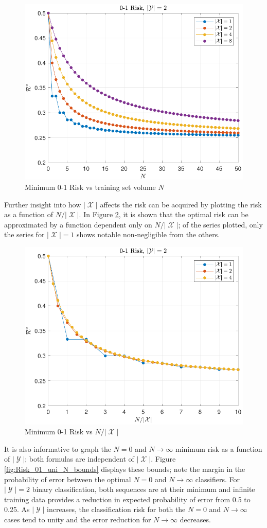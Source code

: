 \documentclass[12pt]{report}
\DeclareMathOperator{\Xcal}{\mathcal{X}}
\DeclareMathOperator{\Ycal}{\mathcal{Y}}
\begin{document}
\begin{figure}
\centering
\includegraphics[width=0.7\linewidth]{Risk_01_uni_N_leg_Mx.pdf}
\caption{Minimum 0-1 Risk vs training set volume $N$}
\label{fig:Risk_01_uni_N_leg_Mx}
\end{figure}

Further insight into how $|\Xcal|$ affects the risk can be acquired by plotting the risk as a function of $N/|\Xcal|$. In Figure \ref{fig:Risk_01_uni_N-Mx}, it is shown that the optimal risk can be approximated by a function dependent only on $N/|\Xcal|$; of the series plotted, only the series for $|\Xcal| = 1$ shows notable non-negligible from the others.

\begin{figure}
\centering
\includegraphics[width=0.7\linewidth]{Risk_01_uni_N-Mx.pdf}
\caption{Minimum 0-1 Risk vs $N/|\Xcal|$}
\label{fig:Risk_01_uni_N-Mx}
\end{figure}


It is also informative to graph the $N=0$ and $N \to \infty$ minimum risk as a function of $|\Ycal|$; both formulas are independent of $|\Xcal|$. Figure \ref{fig:Risk_01_uni_N_bounds} displays these bounds; note the margin in the probability of error between the optimal $N=0$ and $N \to \infty$ classifiers. For $|\Ycal| = 2$ binary classification, both sequences are at their minimum and infinite training data provides a reduction in expected probability of error from 0.5 to 0.25. As $|\Ycal|$ increases, the classification risk for both the $N=0$ and $N \to \infty$ cases tend to unity and the error reduction for $N \to \infty$ decreases. 
\end{document}
